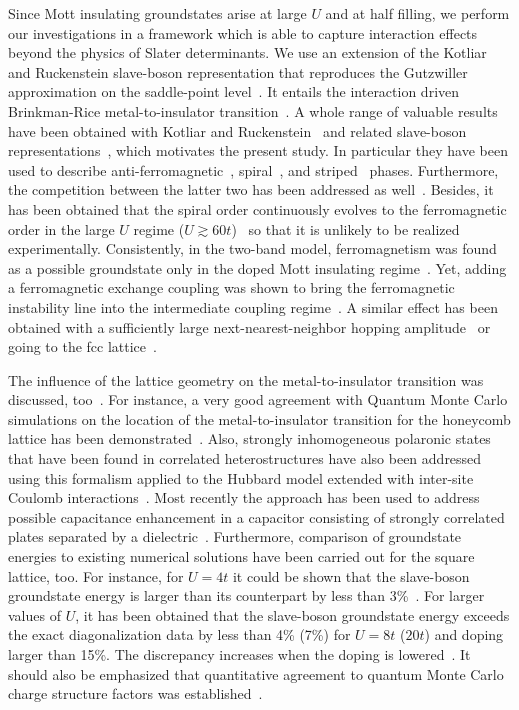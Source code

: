 \documentclass[showpacs,amsmath,twocolumn,floatfix]{revtex4-1}
\begin{document}
Since Mott insulating groundstates arise at large $U$ and at half
filling, we perform our investigations in a framework which is able to
capture interaction effects beyond the physics of Slater determinants.
We use an extension of the Kotliar and Ruckenstein slave-boson
representation that reproduces the Gutzwiller approximation on the
saddle-point level~\cite{Kot86}. It entails the interaction driven
Brinkman-Rice metal-to-insulator transition~\cite{Bri70}. A whole range
of valuable results have been obtained with Kotliar and 
Ruckenstein~\cite{Kot86} and related slave-boson 
representations~\cite{Li89,FW}, which motivates the present study. In 
particular they have been used to describe anti-ferromagnetic~\cite{Lil90}, 
spiral~\cite{Fre91,Igo13,Fre92,Doll2}, and striped~\cite{SeiSi,Fle01,Sei02,Rac06} 
phases. Furthermore, the competition between the latter two has been 
addressed as well~\cite{RaEPL}. Besides, it has been obtained that the 
spiral order continuously evolves to the ferromagnetic order in the
large $U$ regime ($U \gtrsim 60t$)~\cite{Doll2} so that it is unlikely to be realized
experimentally. Consistently, in the two-band model, ferromagnetism was
found as a possible groundstate only in the doped Mott insulating 
regime~\cite{Fre02}. Yet, adding a ferromagnetic exchange coupling was 
shown to bring the ferromagnetic instability line into the intermediate
coupling regime~\cite{lhoutellier15}. A similar effect has been obtained
with a sufficiently large next-nearest-neighbor hopping amplitude~\cite{FW98} or
going to the fcc lattice~\cite{Igo15}.

The influence of the lattice geometry on the metal-to-insulator transition 
was discussed, too~\cite{Kot00}. For instance, a very good agreement with
Quantum Monte Carlo simulations on the location of the
metal-to-insulator transition for the honeycomb lattice has been
demonstrated~\cite{Doll3}. Also, strongly inhomogeneous polaronic states 
that have been found in correlated heterostructures have also been 
addressed using this formalism applied to the Hubbard model extended 
with inter-site Coulomb interactions~\cite{Pav06}. Most recently the
approach has been used to address possible capacitance enhancement in
a capacitor consisting of strongly correlated plates separated by a
dielectric~\cite{Ste17}. Furthermore, comparison of groundstate energies 
to existing numerical solutions have been carried out for the square 
lattice, too. For instance, for $U=4t$ it could be shown that the 
slave-boson groundstate energy is larger than its counterpart by less 
than 3\%~\cite{Fre91}. For larger values of $U$, it has been obtained 
that the slave-boson groundstate energy exceeds the exact diagonalization 
data by less than 4\% (7\%) for $U=8t$ ($20t$) and doping larger than 
15\%. The discrepancy increases when the doping is lowered~\cite{Fre92}. 
It should also be emphasized that quantitative agreement to quantum Monte
Carlo charge structure factors was established~\cite{Zim97}.
\end{document}

